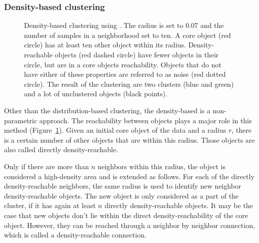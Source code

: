 \documentclass[12pt,a4paper,english]{article}
\begin{document}
\subsubsection*{Density-based clustering}
   	\begin{figure}
   		\vspace*{-23pt}
		\centering
		\def\svgwidth{0.5\textwidth}
		
		\captionsetup{width=.95\linewidth}
		\caption[Density-based clustering using \dbscan.]{Density-based clustering using \dbscan \citep{dbscan:96}. The radius is set to 0.07 and the number of samples in a neighborhood set to ten. A core object (red circle) has at least ten other object within its radius. Density-reachable objects (red dashed circle) have fewer objects in their circle, but are in a core objects reachability. Objects that do not have either of these properties are referred to as noise (red dotted circle). The result of the clustering are two clusters (blue and green) and a lot of unclustered objects (black points).}
		\label{img:density}
	\end{figure}
    Other than the distribution-based clustering, the density-based is a non-parametric approach. The reachability between objects plays a major role in this method (Figure~\ref{img:density}).
	Given an initial core object of the data and a radius $r$, there is a certain number of other objects that are within this radius. Those objects are also called directly density-reachable. 

	Only if there are more than $n$ neighbors within this radius, the object is considered a high-density area and is extended as follows. For each of the directly density-reachable neighbors, the same radius is used to identify new neighbor density-reachable objects. 
	The new object is only considered as a part of the cluster, if it has again at least $n$ directly density-reachable objects.
	It may be the case that new objects don't lie within the direct density-reachability of the core object. However, they can be reached through a neighbor by neighbor connection, which is called a density-reachable connection. 
\end{document}
